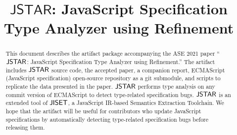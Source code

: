 \documentclass[10pt,conference]{IEEEtran}
\newcommand{\stextsf}[1]{\textsf{\small #1}}
\newcommand{\bigtool}{\textsf{JSTAR}}
\newcommand{\tool}{\stextsf{JSTAR}}
\newcommand{\jiset}{\stextsf{JISET}}
\begin{document}
\title{$\bigtool$: JavaScript Specification Type Analyzer using Refinement}

\author{

  \and


  \and


  \and


  \and

}

\maketitle

\begin{abstract}
  This document describes the artifact package accompanying the ASE 2021 paper
  ``$\tool$: JavaScript Specification Type Analyzer using Refinement.'' The
  artifact includes $\tool$ source code, the accepted paper, a companion report,
  ECMAScript (JavaScript specification) open-source repository as a git
  submodule, and scripts to replicate the data presented in the paper. $\tool$
  performs type analysis on any commit version of ECMAScript to detect
  type-related specification bugs. $\tool$ is an extended tool of $\jiset$, a
  JavaScript IR-based Semantics Extraction Toolchain. We hope that the artifact
  will be useful for contributors who update JavaScript specifications by
  automatically detecting type-related specification bugs before releasing them.
\end{abstract}
\end{document}
